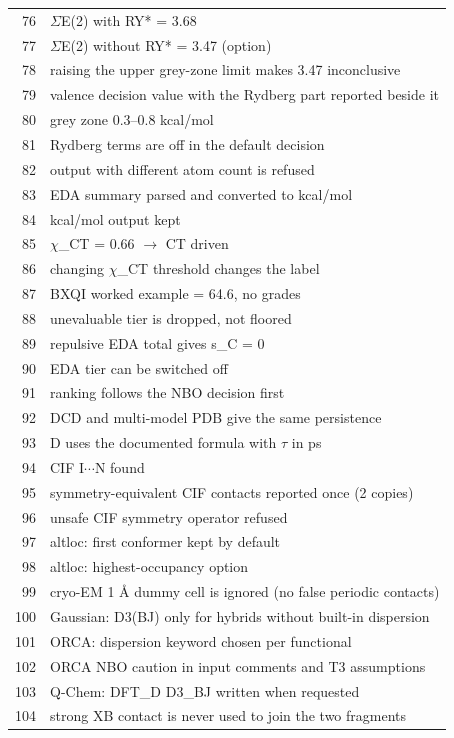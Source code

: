 \documentclass[journal=jcisd8,manuscript=suppinfo]{achemso}
\begin{document}
\begin{singlespace}
{\begin{longtable}{rp{14.5cm}}
76 & $\Sigma$E(2) with RY* = 3.68\\
77 & $\Sigma$E(2) without RY* = 3.47 (option)\\
78 & raising the upper grey-zone limit makes 3.47 inconclusive\\
79 & valence decision value with the Rydberg part reported beside it\\
80 & grey zone 0.3--0.8 kcal/mol\\
81 & Rydberg terms are off in the default decision\\
82 & output with different atom count is refused\\
83 & EDA summary parsed and converted to kcal/mol\\
84 & kcal/mol output kept\\
85 & $\chi$\_CT = 0.66 $\to$ CT driven\\
86 & changing $\chi$\_CT threshold changes the label\\
87 & BXQI worked example = 64.6, no grades\\
88 & unevaluable tier is dropped, not floored\\
89 & repulsive EDA total gives s\_C = 0\\
90 & EDA tier can be switched off\\
91 & ranking follows the NBO decision first\\
92 & DCD and multi-model PDB give the same persistence\\
93 & D uses the documented formula with $\tau$ in ps\\
94 & CIF I$\cdots$N found\\
95 & symmetry-equivalent CIF contacts reported once (2 copies)\\
96 & unsafe CIF symmetry operator refused\\
97 & altloc: first conformer kept by default\\
98 & altloc: highest-occupancy option\\
99 & cryo-EM 1 \AA{} dummy cell is ignored (no false periodic contacts)\\
100 & Gaussian: D3(BJ) only for hybrids without built-in dispersion\\
101 & ORCA: dispersion keyword chosen per functional\\
102 & ORCA NBO caution in input comments and T3 assumptions\\
103 & Q-Chem: DFT\_D D3\_BJ written when requested\\
104 & strong XB contact is never used to join the two fragments\\

\end{longtable}}
\end{singlespace}
\end{document}

